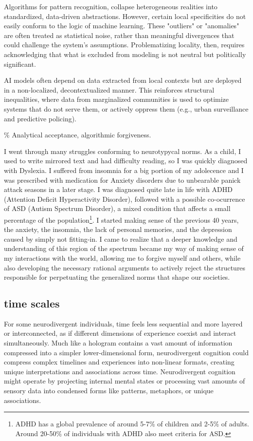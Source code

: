 Algorithms for pattern recognition, collapse heterogeneous realities into standardized, data-driven abstractions. However, certain local specificities do not easily conform to the logic of machine learning. These "outliers" or "anomalies" are often treated as statistical noise, rather than meaningful divergences that could challenge the system's assumptions. Problematizing locality, then, requires acknowledging that what is excluded from modeling is not neutral but politically significant.

AI models often depend on data extracted from local contexts but are deployed in a non-localized, decontextualized manner. This reinforces structural inequalities, where data from marginalized communities is used to optimize systems that do not serve them, or actively oppress them (e.g., urban surveillance and predictive policing).

{\scriptsize \textcolor{comment}{\% Analytical acceptance, algorithmic forgiveness. }}

I went through many struggles conforming to neurotypycal norms. As a child, I used to write mirrored text and had difficulty reading, so I was quickly diagnosed with Dyslexia. I suffered from insomnia for a big portion of my adolecence and I was prescribed with medication for Anxiety disorders due to unbearable panick attack seasons in a later stage. I was diagnosed quite late in life with ADHD (Attention Deficit Hyperactivity Disorder), followed with a possible co-ocurrence of ASD (Autism Spectrum Disorder), a mixed condition that affects a small percentage of the population\footnote{ADHD has a global prevalence of around 5-7\% of children and 2-5\% of adults. Around 20-50\% of individuals with ADHD also meet criteria for ASD.}. I started making sense of the previous 40 years, the anxiety, the insomnia, the lack of personal memories, and the depression caused by simply not fitting-in. I came to realize that a deeper knowledge and understanding of this region of the spectrum became my way of making sense of my interactions with the world, allowing me to forgive myself and others, while also developing the necessary rational arguments to actively reject the structures responsible for perpetuating the generalized norms that shape our societies.

\subsection*{time scales}

For some neurodivergent individuals, time feels less sequential and more layered or interconnected, as if different dimensions of experience coexist and interact simultaneously. Much like a hologram contains a vast amount of information compressed into a simpler lower-dimensional form, neurodivergent cognition could compress complex timelines and experiences into non-linear formats, creating unique interpretations and associations across time.
Neurodivergent cognition might operate by projecting internal mental states or processing vast amounts of sensory data into condensed forms like patterns, metaphors, or unique associations. 

